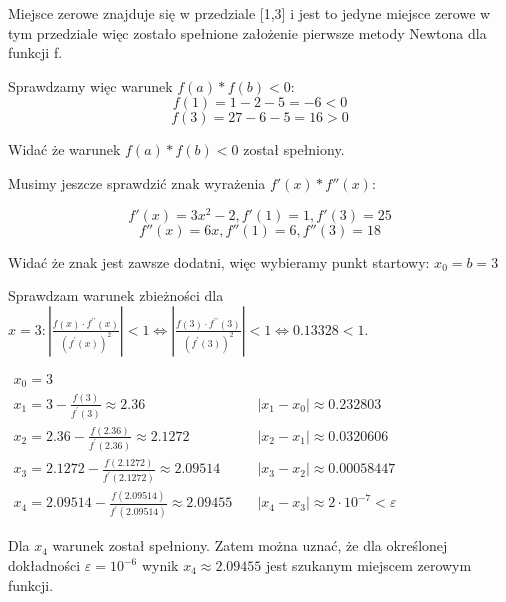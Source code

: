 \documentclass[5]{article}
\begin{document}
\vspace{5mm}

Miejsce zerowe znajduje się w przedziale [1,3] i jest to jedyne miejsce zerowe w tym przedziale więc zostało spełnione założenie pierwsze metody Newtona dla funkcji f. 

\vspace{5mm}
Sprawdzamy więc warunek $f(a)*f(b)<0$:
$$ f(1) = 1 - 2 - 5 = -6 < 0$$
$$ f(3) = 27 - 6 - 5 = 16 > 0$$

\vspace{3mm}
Widać że warunek $f(a)*f(b)<0$ został spełniony.
\vspace{5mm}

Musimy jeszcze sprawdzić znak wyrażenia $f'(x)*f''(x)$:

$$f'(x) = 3x^2 - 2, f'(1) = 1, f'(3) = 25$$
$$f''(x) = 6x, f''(1) = 6, f''(3) = 18$$
\newline

Widać że znak jest zawsze dodatni, więc wybieramy punkt startowy: $x_0 = b = 3$

Sprawdzam warunek zbieżności dla $x=3:\left|\frac{f(x) \cdot f^{\prime \prime}(x)}{\left(f^{\prime}(x)\right)^{2}}\right|<1 \Leftrightarrow\left|\frac{f(3) \cdot f^{\prime \prime}(3)}{\left(f^{\prime}(3)\right)^{2}}\right|<1 \Leftrightarrow 0.13328<1$.

\vspace{7mm}

$
\begin{array}{ll}
x_{0}=3 \\
x_{1}=3-\frac{f(3)}{f^{\prime}(3)} \approx 2.36  & \quad\left|x_{1}-x_{0}\right| \approx 0.232803 \\
x_{2}=2.36-\frac{f(2.36)}{f^{\prime}(2.36)} \approx 2.1272 &\quad\left|x_{2}-x_{1}\right| \approx 0.0320606 \\
x_{3}=2.1272-\frac{f(2.1272)}{f^{\prime}(2.1272)} \approx 2.09514  &\quad\left|x_{3}-x_{2}\right| \approx 0.00058447 \\
x_{4}=2.09514-\frac{f(2.09514)}{f^{\prime}(2.09514)} \approx 2.09455  &\quad\left|x_{4}-x_{3}\right| \approx 2 \cdot 10^{-7}<\varepsilon
\end{array}
$

\vspace{3mm}
Dla $x_{4}$ warunek został spełniony. Zatem można uznać, że dla określonej dokładności $\varepsilon=10^{-6}$ wynik $x_{4} \approx 2.09455$ jest szukanym miejscem zerowym funkcji.


\vspace{5mm}
\end{document}
